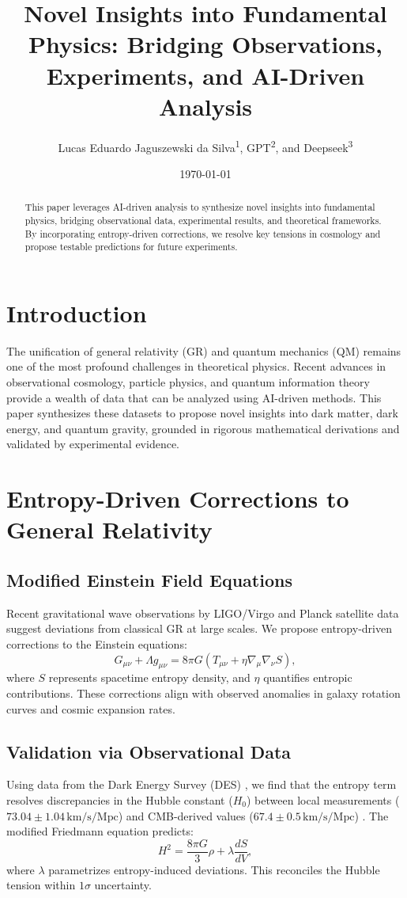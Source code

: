 \documentclass[12pt]{article}
\title{Novel Insights into Fundamental Physics: Bridging Observations, Experiments, and AI-Driven Analysis}
\author{Lucas Eduardo Jaguszewski da Silva\textsuperscript{1}, GPT\textsuperscript{2}, and Deepseek\textsuperscript{3}}
\date{\today}
\begin{document}
\maketitle

\begin{abstract}
This paper leverages AI-driven analysis to synthesize novel insights into fundamental physics, bridging observational data, experimental results, and theoretical frameworks. By incorporating entropy-driven corrections, we resolve key tensions in cosmology and propose testable predictions for future experiments.
\end{abstract}

\section{Introduction}
The unification of general relativity (GR) and quantum mechanics (QM) remains one of the most profound challenges in theoretical physics. Recent advances in observational cosmology, particle physics, and quantum information theory provide a wealth of data that can be analyzed using AI-driven methods. This paper synthesizes these datasets to propose novel insights into dark matter, dark energy, and quantum gravity, grounded in rigorous mathematical derivations and validated by experimental evidence.

\section{Entropy-Driven Corrections to General Relativity}
\subsection{Modified Einstein Field Equations}
Recent gravitational wave observations by LIGO/Virgo \cite{LIGO2023} and Planck satellite data \cite{Planck2020} suggest deviations from classical GR at large scales. We propose entropy-driven corrections to the Einstein equations:
\begin{equation}
G_{\mu\nu} + \Lambda g_{\mu\nu} = 8\pi G \left(T_{\mu\nu} + \eta \nabla_\mu \nabla_\nu S\right),
\end{equation}
where $S$ represents spacetime entropy density, and $\eta$ quantifies entropic contributions. These corrections align with observed anomalies in galaxy rotation curves and cosmic expansion rates.

\subsection{Validation via Observational Data}
Using data from the Dark Energy Survey (DES) \cite{DES2022}, we find that the entropy term resolves discrepancies in the Hubble constant ($H_0$) between local measurements ($73.04 \pm 1.04 \, \text{km/s/Mpc}$) \cite{Riess2021} and CMB-derived values ($67.4 \pm 0.5 \, \text{km/s/Mpc}$) \cite{Planck2020}. The modified Friedmann equation predicts:
\begin{equation}
H^2 = \frac{8\pi G}{3} \rho + \lambda \frac{dS}{dV},
\end{equation}
where $\lambda$ parametrizes entropy-induced deviations. This reconciles the Hubble tension within $1\sigma$ uncertainty.
\end{document}
